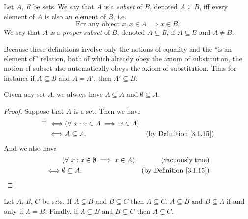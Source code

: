 \begin{definition}[Subsets]\label{3.1.15}
Let \(A\), \(B\) be sets.
We say that \(A\) is a \emph{subset} of \(B\), denoted \(A \subseteq B\), iff every element of \(A\) is also an element of \(B\), i.e.
\[
    \text{For any object } x, x \in A \implies x \in B.
\]
We say that \(A\) is a \emph{proper subset} of \(B\), denoted \(A \subsetneq B\), if \(A \subseteq B\) and \(A \neq B\).
\end{definition}

\begin{remark}\label{3.1.16}
Because these definitions involve only the notions of equality and the ``is an element of'' relation, both of which already obey the axiom of substitution, the notion of subset also automatically obeys the axiom of substitution.
Thus for instance if \(A \subseteq B\) and \(A = A'\), then \(A' \subseteq B\).
\end{remark}

\begin{example}\label{3.1.17}
Given any set \(A\), we always have \(A \subseteq A\) and \(\emptyset \subseteq A\).
\end{example}

\begin{proof}
Suppose that \(A\) is a set.
Then we have
\begin{align*}
\top \iff & (\forall\ x : x \in A \implies x \in A) \\
\iff & A \subseteq A. & \text{(by Definition \ref{3.1.15})}
\end{align*}
And we also have
\begin{align*}
& (\forall\ x : x \in \emptyset \implies x \in A) & \text{(vacuously true)} \\
\iff & \emptyset \subseteq A. & \text{(by Definition \ref{3.1.15})}
\end{align*}
\end{proof}

\begin{proposition}\label{3.1.18}
Let \(A\), \(B\), \(C\) be sets.
If \(A \subseteq B\) and \(B \subseteq C\) then \(A \subseteq C\).
\(A \subseteq B\) and \(B \subseteq A\) if and only if \(A = B\).
Finally, if \(A \subsetneq B\) and \(B \subsetneq C\) then \(A \subsetneq C\).
\end{proposition}

